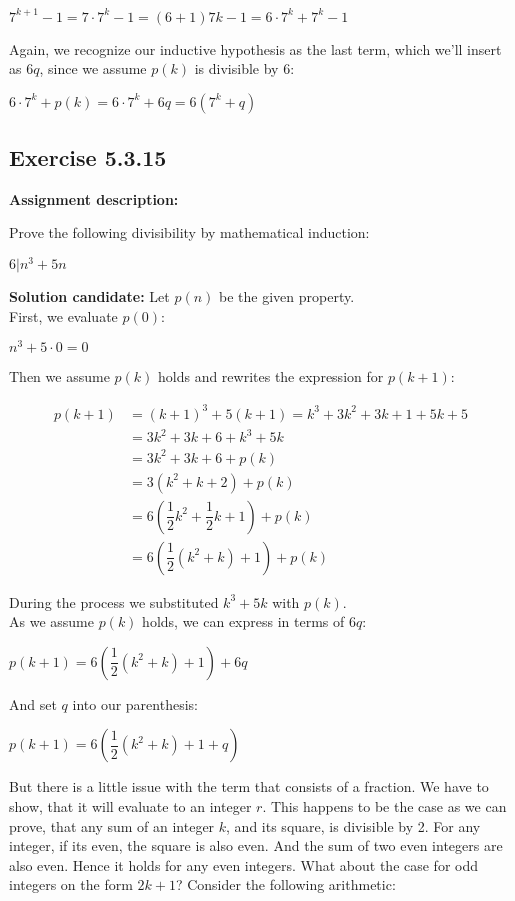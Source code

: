 \documentclass{report}
\newcommand{\cent}[1]{\begin{center}#1\end{center}}
\newcommand{\mAlign}[1]{\begin{align*}#1\end{align*}}
\newcommand{\AssignmentDescription}{\textbf{Assignment description: }}
\newcommand{\Solution}{\textbf{Solution candidate: }}
\newcommand{\QED}{\boxed{}}
\newcommand{\Exercise}[1]{\subsection{Exercise #1}}
\newcommand{\parenthesis}[1]{\left( #1 \right)}
\begin{document}
 	\cent{$7^{k+1}-1 = 7 \cdot 7^k - 1 = (6+1) 7k - 1 = 6 \cdot 7^k + 7^k - 1$}
 	
 	Again, we recognize our inductive hypothesis as the last term, which we'll insert as $6q$, since we assume $p(k)$ is divisible by 6:
 	
 	\cent{$6 \cdot 7^k + p(k) = 6 \cdot 7^k + 6q = 6(7^k + q)$}
 	
 	\QED
 	
 	\Exercise{5.3.15}
 	
 	\AssignmentDescription
 	
 	Prove the following divisibility by mathematical induction:
 	
 	\cent{$6|n^3+5n$}
 	
 	\Solution
 	Let $p(n)$ be the given property.\\
 	
 	First, we evaluate $p(0)$:
 	
 	\cent{$n^3 +5 \cdot 0 = 0$}
 	
 	Then we assume $p(k)$ holds and rewrites the expression for $p(k+1)$:
 	
 	\mAlign{
 		p(k+1) &= (k+1)^3 + 5(k+1) = k^3 + 3k^2 + 3k + 1 + 5k+5 \\
 		&= 3k^2 + 3k + 6 + k^3 + 5k \\
 		&= 3k^2 + 3k + 6 + p(k) \\
 		&= 3(k^2+k + 2 ) + p(k)\\
 		&= 6\parenthesis{\dfrac{1}{2}k^2 + \dfrac{1}{2}k + 1} + p(k) \\
 		&= 6\parenthesis{\dfrac{1}{2}\parenthesis{k^2 + k} + 1} + p(k)
 	}
 
 	During the process we substituted $k^3+5k$ with $p(k)$.\\
 	
 	As we assume $p(k)$ holds, we can express in terms of $6q$:
 
 	\cent{$ p(k+1) = 6\parenthesis{\dfrac{1}{2}\parenthesis{k^2 + k} + 1} + 6q$}
 	
 	And set $q$ into our parenthesis:
 	
 	\cent{$p(k+1) = 6\parenthesis{\dfrac{1}{2}\parenthesis{k^2 + k} +1+ q}$}
 	
 	But there is a little issue with the term that consists of a fraction. We have to show, that it will evaluate to an integer $r$. This happens to be the case as we can prove, that any sum of an integer $k$, and its square, is divisible by 2. For any integer, if its even, the square is also even. And the sum of two even integers are also even. Hence it holds for any even integers. What about the case for odd integers on the form $2k+1$? Consider the following arithmetic:
 	
\end{document}
